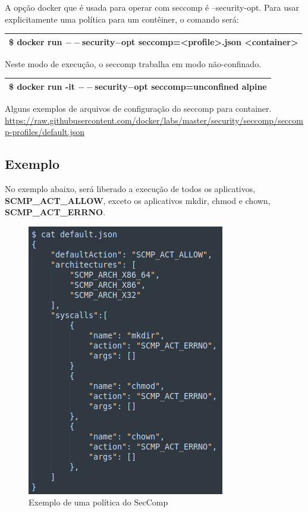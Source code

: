 \documentclass[12pt]{article}
\begin{document}
A opção docker que é usada para operar com seccomp é --security-opt. Para usar explicitamente uma política para um  contêiner, o comando será:

\begin{table}[H]
	\begin{tabular}{|l|}
	\hline
	\$ docker run $--$security$-$opt seccomp=\textless profile\textgreater.json \textless container\textgreater\\
	\hline
	\end{tabular}
\end{table}

Neste modo de execução, o seccomp trabalha em modo não-confinado.

\begin{table}[H]
	\begin{tabular}{|l|}
	\hline
	\$ docker run -it $--$security$-$opt seccomp=unconfined alpine\\
	\hline
	\end{tabular}
\end{table}

Alguns exemplos de arquivos de configuração do seccomp para container.\\
\url{https://raw.githubusercontent.com/docker/labs/master/security/seccomp/seccomp-profiles/default.json}

\subsection{Exemplo}

No exemplo abaixo, será liberado a execução de todos os aplicativos, \textbf{SCMP\_ACT\_ALLOW}, exceto os aplicativos mkdir, chmod e chown, \textbf{SCMP\_ACT\_ERRNO}.

\begin{figure}[H]
	\centering
	\includegraphics[scale=0.63]{img/default.png}
	\caption{Exemplo de uma política do SecComp}
\end{figure}
\end{document}
